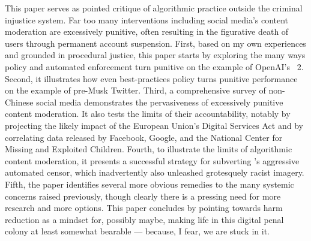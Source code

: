 This paper serves as pointed critique of algorithmic practice outside the
criminal injustice system. Far too many interventions including social media's
content moderation are excessively punitive, often resulting in the figurative
death of users through permanent account suspension. First, based on my own
experiences and grounded in procedural justice, this paper starts by exploring
the many ways policy and automated enforcement turn punitive on the example of
OpenAI's \DALLE\ 2. Second, it illustrates how even best-practices policy turns
punitive performance on the example of pre-Musk Twitter. Third, a comprehensive
survey of non-Chinese social media demonstrates the pervasiveness of excessively
punitive content moderation. It also tests the limits of their accountability,
notably by projecting the likely impact of the European Union's Digital Services
Act and by correlating data released by Facebook, Google, and the National
Center for Missing and Exploited Children. Fourth, to illustrate the limits of
algorithmic content moderation, it presents a successful strategy for subverting
\DALLE's aggressive automated censor, which inadvertently also unleashed
grotesquely racist imagery. Fifth, the paper identifies several more obvious
remedies to the many systemic concerns raised previously, though clearly there
is a pressing need for more research and more options. This paper concludes by
pointing towards harm reduction as a mindset for, possibly maybe, making life in
this digital penal colony at least somewhat bearable --- because, I fear, we are
stuck in it.
